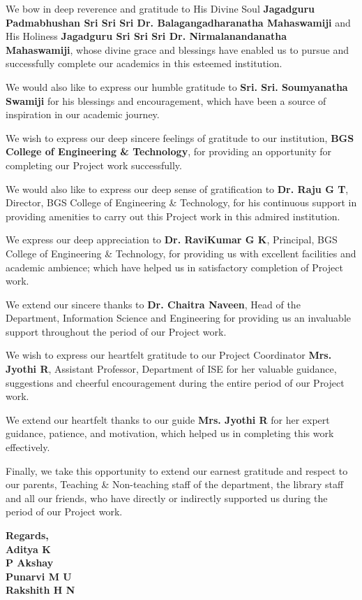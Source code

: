 \documentclass[12pt,a4paper]{report}
\begin{document}
We bow in deep reverence and gratitude to His Divine Soul \textbf{Jagadguru Padmabhushan Sri Sri Sri Dr. Balagangadharanatha Mahaswamiji} and His Holiness \textbf{Jagadguru Sri Sri Sri Dr. Nirmalanandanatha Mahaswamiji}, whose divine grace and blessings have enabled us to pursue and successfully complete our academics in this esteemed institution.

We would also like to express our humble gratitude to \textbf{Sri. Sri. Soumyanatha Swamiji} for his blessings and encouragement, which have been a source of inspiration in our academic journey.

We wish to express our deep sincere feelings of gratitude to our institution, \textbf{BGS College of Engineering \& Technology}, for providing an opportunity for completing our Project work successfully.

We would also like to express our deep sense of gratification to \textbf{Dr. Raju G T}, Director, BGS College of Engineering \& Technology, for his continuous support in providing amenities to carry out this Project work in this admired institution.

We express our deep appreciation to \textbf{Dr. RaviKumar G K}, Principal, BGS College of Engineering \& Technology, for providing us with excellent facilities and academic ambience; which have helped us in satisfactory completion of Project work.

We extend our sincere thanks to \textbf{Dr. Chaitra Naveen}, Head of the Department, Information Science and Engineering for providing us an invaluable support throughout the period of our Project work.

We wish to express our heartfelt gratitude to our Project Coordinator \textbf{Mrs. Jyothi R}, Assistant Professor, Department of ISE for her valuable guidance, suggestions and cheerful encouragement during the entire period of our Project work.

We extend our heartfelt thanks to our guide \textbf{Mrs. Jyothi R} for her expert guidance, patience, and motivation, which helped us in completing this work effectively.

Finally, we take this opportunity to extend our earnest gratitude and respect to our parents, Teaching \& Non-teaching staff of the department, the library staff and all our friends, who have directly or indirectly supported us during the period of our Project work.

\vspace{0.5cm}

\begin{flushright}
  \textbf{Regards,} \\
  \textbf{Aditya K} \quad [1MP23IS003] \\
  \textbf{P Akshay} \quad [1MP23IS038] \\
  \textbf{Punarvi M U} \quad [1MP23IS042] \\
  \textbf{Rakshith H N} \quad [1MP23IS043]
\end{flushright}
\end{document}
